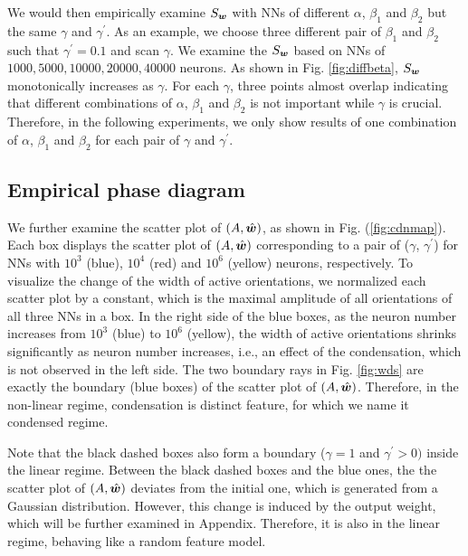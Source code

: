 \documentclass{article}
\begin{document}
We would then empirically examine $S_{\bm{w}}$ with  NNs of  different  $\alpha$, $\beta_1$ and $\beta_2$ but  the same $\gamma$ and $\gamma^{\prime}$. As an example, we choose three different pair of $\beta_1$ and $\beta_2$ such that  $\gamma^{\prime}=0.1$ and scan $\gamma$. We examine the $S_{\bm{w}}$ based on NNs of $1000,5000,10000,20000,40000$ neurons. As shown in Fig. \ref{fig:diffbeta},  $S_{\bm{w}}$ monotonically increases as $\gamma$. For each $\gamma$, three points almost overlap indicating that different combinations of  $\alpha$, $\beta_1$ and $\beta_2$ is not important while $\gamma$ is crucial.  Therefore, in the following experiments, we only show results of one combination of $\alpha$, $\beta_1$ and $\beta_2$  for each pair of $\gamma$ and $\gamma^{\prime}$.


\subsection{Empirical phase diagram}


We further examine the scatter plot of  $(A,\hat{\bm{w}})$, as shown in Fig. (\ref{fig:cdnmap}). Each box displays the scatter plot of  $(A,\hat{\bm{w}})$ corresponding to a pair of ($\gamma$, $\gamma^{\prime}$) for NNs with $10^{3}$ (blue), $10^{4}$ (red) and $10^{6}$ (yellow) neurons, respectively. To visualize the change of the width of active orientations, we normalized each scatter plot by a constant, which is the maximal amplitude of all orientations of all three NNs in a box.  In the right side of  the blue boxes, as the neuron number increases from $10^{3}$ (blue) to $10^{6}$ (yellow), the width of active orientations shrinks significantly as neuron number increases, i.e., an effect of the condensation, which is not observed in the left side.  The two boundary rays in Fig. \ref{fig:wds} are exactly the boundary (blue boxes) of the scatter plot of  $(A,\hat{\bm{w}})$. Therefore, in the non-linear regime, condensation is distinct feature, for which we name it condensed regime.

Note that the black dashed boxes also form a boundary ($\gamma=1$ and $\gamma^{\prime}>0)$ inside the linear regime. Between the black dashed boxes and the blue ones, the the scatter plot of  $(A,\hat{\bm{w}})$ deviates from the initial one, which is generated from  a Gaussian distribution. However, this change is induced by the output weight, which will be further examined in Appendix. Therefore, it is also in the linear regime, behaving like a random feature model.
\end{document}
